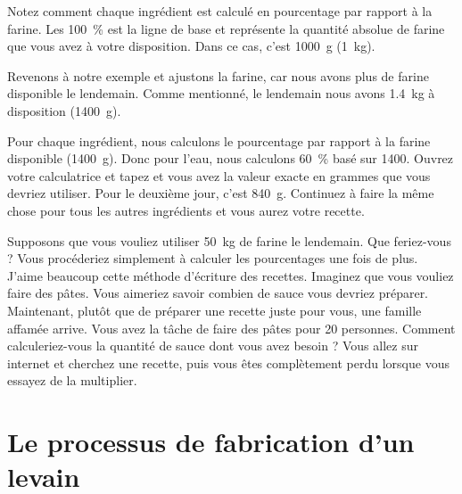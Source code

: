 Notez comment chaque ingrédient est calculé en pourcentage
par rapport à la farine. Les \qty{100}{\percent} est la ligne de base et représente la quantité absolue
de farine que vous avez à votre disposition. Dans ce cas, c'est \qty{1000}{\gram}
(\qty{1}{\kg}).

Revenons à notre exemple et ajustons la farine, car nous avons
plus de farine disponible le lendemain. Comme mentionné, le lendemain
nous avons \qty{1.4}{\kg} à disposition (\qty{1400}{\gram}).

\begin{table}[!htb]
    \begin{center}
        
        \caption[Un autre exemple de la mathématique du boulanger]{Une recette exemple qui utilise
            \qty{1400}{\gram} comme ligne de base et qui est ensuite calculée en utilisant
            la mathématique du boulanger.}
    \end{center}
\end{table}

Pour chaque ingrédient, nous calculons le pourcentage
par rapport à la farine disponible (\qty{1400}{\gram}). Donc pour l'eau,
nous calculons \qty{60}{\percent} basé sur \num{1400}. Ouvrez votre
calculatrice et tapez  et vous avez
la valeur exacte en grammes que vous devriez utiliser.
Pour le deuxième jour, c'est \qty{840}{\gram}. Continuez à faire la même
chose pour tous les autres ingrédients et vous aurez
votre recette.

Supposons que vous vouliez utiliser \qty{50}{\kg} de farine
le lendemain. Que feriez-vous ? Vous procéderiez simplement à
calculer les pourcentages une fois de plus. J'aime beaucoup cette
méthode d'écriture des recettes. Imaginez que vous vouliez faire
des pâtes. Vous aimeriez savoir combien de sauce vous devriez
préparer. Maintenant, plutôt que de préparer une recette juste pour vous, une
famille affamée arrive. Vous avez la tâche de faire des pâtes
pour \num{20} personnes. Comment calculeriez-vous la quantité de sauce
dont vous avez besoin ? Vous allez sur internet et cherchez une recette, puis
vous êtes complètement perdu lorsque vous essayez de la multiplier.

\section{Le processus de fabrication d'un levain}

